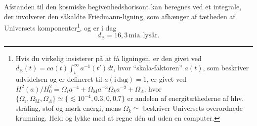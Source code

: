 \documentclass[useAMS,danish]{aa}
\begin{document}
Afstanden til den kosmiske begivenhedshorisont kan beregnes ved et integrale, der involverer den såkaldte Friedmann-ligning, som afhænger af tætheden af Universets komponenter\footnote{Hvis du virkelig insisterer på at få ligningen, er den givet ved
$d_\mathrm{B}(t) = c a(t) \int_t^\infty a^{-1}(t')dt$,
hvor ``skala-faktoren'' $a(t)$, som beskriver udvidelsen og er defineret til $a(\mathrm{i\,dag}) = 1$, er givet ved
$H^2(a)/H_0^2 = \Omega_\mathrm{r}a^{-4} + \Omega_\mathrm{M}a^{-3} \Omega_k a^{-2} + \Omega_\Lambda$,
hvor $\{\Omega_\mathrm{r}, \Omega_\mathrm{M}, \Omega_\Lambda\} \simeq \{\lesssim10^{-4},0.3,0,0.7\}$ er andelen af energitæthederne af hhv. stråling, stof og mørk energi, mens $\Omega_k\simeq$ beskriver Universets overordnede krumning. Held og lykke med at regne dén ud uden en computer.}, og er i dag
\begin{equation}
    \label{eq:dB}
        d_\mathrm{B} = 16,\!3\,\mathrm{mia.\,lysår}.
\end{equation}


\end{document}
